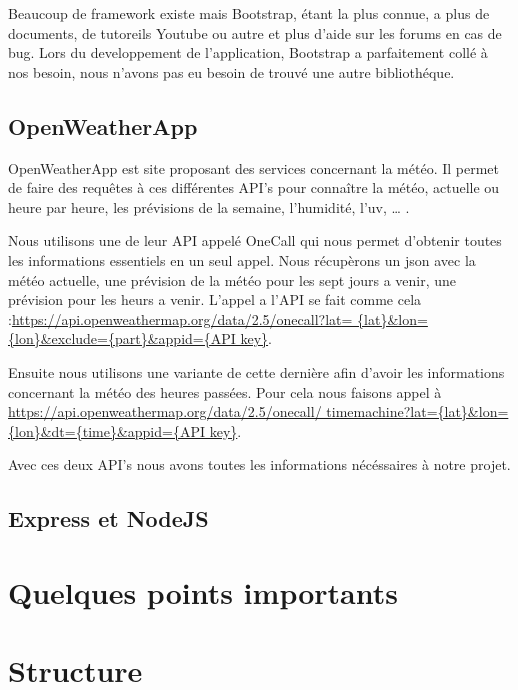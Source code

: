 \documentclass[a4paper, 12pt, french]{article}
\begin{document}
			Beaucoup de framework existe mais Bootstrap, étant la plus connue, a plus de
			documents, de tutoreils Youtube ou autre et plus d'aide sur les forums en cas de
			bug. Lors du developpement de l'application, Bootstrap a parfaitement
			collé à nos besoin, nous n'avons pas eu besoin de trouvé une autre bibliothéque.

		\subsection{OpenWeatherApp}
			OpenWeatherApp est site proposant des services concernant la météo. Il permet
			de faire des requêtes à ces différentes API's pour connaître la météo, actuelle
			ou heure par heure, les prévisions de la semaine, l'humidité, l'uv, \ldots
			\cite*{OpenWeatherApp}.

			Nous utilisons une de leur API appelé OneCall \cite*{OpenWeatherApp-OneCall}
			qui nous permet d'obtenir toutes les informations essentiels en un seul appel.
			Nous récupèrons un json avec la météo actuelle, une prévision de la météo pour
			les sept jours a venir, une prévision pour les heurs a venir. L'appel a l'API se
			fait comme cela :\url{https://api.openweathermap.org/data/2.5/onecall?lat=
			{lat}&lon={lon}&exclude={part}&appid={API key}}.

			Ensuite nous utilisons une variante de cette dernière afin d'avoir les informations
			concernant la météo des heures passées. Pour cela nous faisons appel à 
			\url{https://api.openweathermap.org/data/2.5/onecall/
			timemachine?lat={lat}&lon={lon}&dt={time}&appid={API key}}.

			Avec ces deux API's nous avons toutes les informations nécéssaires à notre projet.

		\subsection{Express et NodeJS}

		\subsection{}

	\section{Quelques points importants}
	\section{Structure}

	\printbibliography
\end{document}
